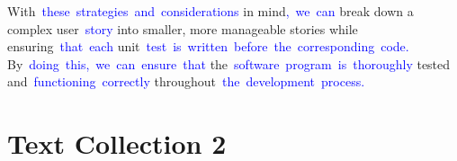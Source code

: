 \documentclass{article}
\begin{document}
\begin{tcolorbox}[colframe=black,colback=white]
{}With\textcolor{blue}{~these}\textcolor{blue}{~strategies}\textcolor{blue}{~and}\textcolor{blue}{~considerations} in mind\textcolor{blue}{,}\textcolor{blue}{~we}\textcolor{blue}{~can} break down a complex user\textcolor{blue}{~story} into smaller, more manageable stories while ensuring\textcolor{blue}{~that}\textcolor{blue}{~each} unit\textcolor{blue}{~test}\textcolor{blue}{~is}\textcolor{blue}{~written}\textcolor{blue}{~before}\textcolor{blue}{~the}\textcolor{blue}{~corresponding}\textcolor{blue}{~code}\textcolor{blue}{.} By\textcolor{blue}{~doing}\textcolor{blue}{~this}\textcolor{blue}{,}\textcolor{blue}{~we}\textcolor{blue}{~can}\textcolor{blue}{~ensure}\textcolor{blue}{~that} the\textcolor{blue}{~software}\textcolor{blue}{~program}\textcolor{blue}{~is}\textcolor{blue}{~thoroughly} tested and\textcolor{blue}{~functioning}\textcolor{blue}{~correctly} throughout\textcolor{blue}{~the}\textcolor{blue}{~development}\textcolor{blue}{~process}\textcolor{blue}{.}\textcolor{blue}{}
\end{tcolorbox}


\section*{Text Collection 2}
\end{document}
